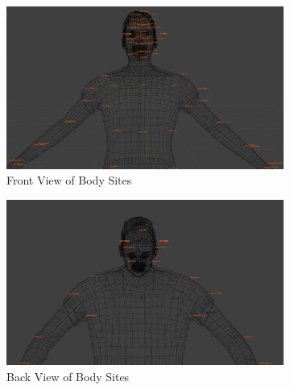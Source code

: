 \documentclass[../../main.tex]{subfiles}
\begin{document}
\begin{figure}[h]
    \centering
    \begin{subfigure}[b]{0.3\textwidth}
        \centering
        \includegraphics[width=\textwidth]{chapters/rigging_layers/images/sites_body_front.png}
        \caption{Front View of Body Sites}
        \label{fig:sites_body_front}
    \end{subfigure}
    \hfill
    \begin{subfigure}[b]{0.3\textwidth}
        \centering
        \includegraphics[width=\textwidth]{chapters/rigging_layers/images/sites_body_back.png}
        \caption{Back View of Body Sites}
        \label{fig:sites_body_back}
    \end{subfigure}
    \hfill
    \begin{subfigure}[b]{0.3\textwidth}
        \centering

\end{subfigure}
\end{figure}
\end{document}
